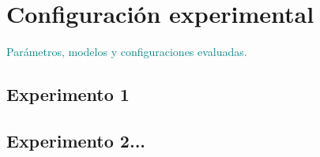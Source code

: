 \section{Configuración experimental}
\textcolor{teal}{Parámetros, modelos y configuraciones evaluadas.}
\subsection{Experimento 1}
\subsection{Experimento 2...}
